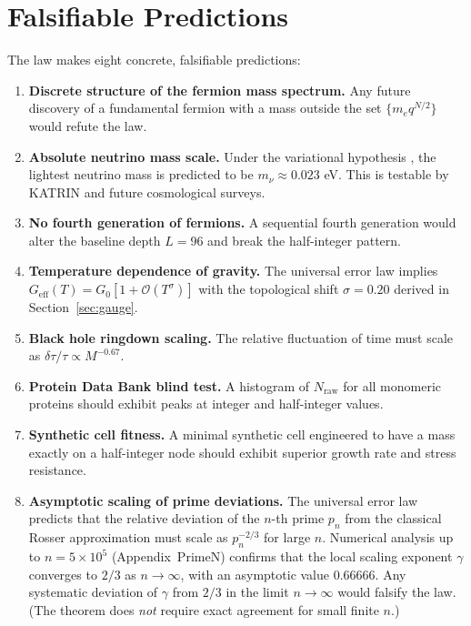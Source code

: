 \documentclass[12pt,a4paper]{article}
\theoremstyle{remark}
\begin{document}
	\section{Falsifiable Predictions}
	\label{sec:predictions}
	
	The law makes eight concrete, falsifiable predictions:
	
	\begin{enumerate}[label=(\arabic*)]
		\item \textbf{Discrete structure of the fermion mass spectrum.}  Any future
		discovery of a fundamental fermion with a mass outside the set
		\(\{m_e q^{N/2}\}\) would refute the law.
		\item \textbf{Absolute neutrino mass scale.}  Under the variational hypothesis
		\cite{AppendixLambda}, the lightest neutrino mass is predicted to be
		\(m_{\nu} \approx 0.023\) eV.  This is testable by KATRIN and future
		cosmological surveys.
		\item \textbf{No fourth generation of fermions.}  A sequential fourth
		generation would alter the baseline depth \(L = 96\) and break the
		half-integer pattern.
		\item \textbf{Temperature dependence of gravity.}  The universal error law
		implies \(G_{\mathrm{eff}}(T) = G_0[1 + \mathcal{O}(T^{\sigma})]\) with the
		topological shift \(\sigma = 0.20\) derived in Section~\ref{sec:gauge}.
		\item \textbf{Black hole ringdown scaling.}  The relative fluctuation of time
		must scale as \(\delta\tau/\tau \propto M^{-0.67}\).
		\item \textbf{Protein Data Bank blind test.}  A histogram of \(N_{\mathrm{raw}}\)
		for all monomeric proteins should exhibit peaks at integer and half-integer
		values.
		\item \textbf{Synthetic cell fitness.}  A minimal synthetic cell engineered
		to have a mass exactly on a half-integer node should exhibit superior growth
		rate and stress resistance.
		\item \textbf{Asymptotic scaling of prime deviations.}  The universal error
		law predicts that the relative deviation of the \(n\)-th prime \(p_n\) from
		the classical Rosser approximation must scale as \(p_n^{-2/3}\) for large
		\(n\).  Numerical analysis up to \(n = 5\times10^5\) (Appendix~PrimeN)
		confirms that the local scaling exponent \(\gamma\) converges to \(2/3\) as
		\(n\to\infty\), with an asymptotic value \(0.66666\).  Any systematic
		deviation of \(\gamma\) from \(2/3\) in the limit \(n\to\infty\) would
		falsify the law.  (The theorem does \emph{not} require exact agreement
		for small finite \(n\).)
	\end{enumerate}
	
\end{document}
